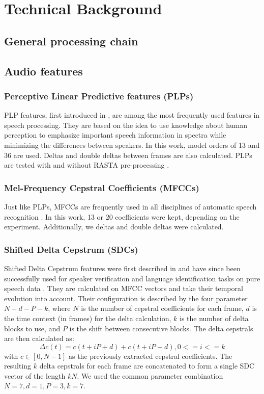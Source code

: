 
\chapter{Technical Background}	\label{chap:background}
\section{General processing chain}
\section{Audio features}
\subsection{Perceptive Linear Predictive features (PLPs)} 
PLP features, first introduced in \cite{hermansky90}, are among the most frequently used features in speech processing. They are based on the idea to use knowledge about human perception to emphasize important speech information in spectra while minimizing the differences between speakers. In this work, model orders of 13 and 36 are used. Deltas and double deltas between frames are also calculated. PLPs are tested with and without RASTA pre-processing \cite{rasta_plp}.
\subsection{Mel-Frequency Cepstral Coefficients (MFCCs)} 
Just like PLPs, MFCCs are frequently used in all disciplines of automatic speech recognition \cite{zissman}. In this work, 13 or 20 coefficients were kept, depending on the experiment. Additionally, we deltas and double deltas were calculated.
\subsection{Shifted Delta Cepstrum (SDCs)} 
Shifted Delta Cepstrum features were first described in \cite{bielefeld} and have since been successfully used for speaker verification and language identification tasks on pure speech data \cite{torres} \cite{campbell} \cite{allen}. They are calculated on MFCC vectors and take their temporal evolution into account. Their configuration is described by the four parameter $N-d-P-k$, where $N$ is the number of cepstral coefficients for each frame, $d$ is the time context (in frames) for the delta calculation, $k$ is the number of delta blocks to use, and $P$ is the shift between consecutive blocks. The delta cepstrals are then calculated as:
\begin{equation}
\Delta c(t) = c(t+iP+d)+c(t+iP-d), 0<=i<=k
\end{equation}
with $c \in [0, N-1]$ as the previously extracted cepstral coefficients. The resulting $k$ delta cepstrals for each frame are concatenated to form a single SDC vector of the length $kN$. We used the common parameter combination $N=7, d=1, P=3, k=7$.
